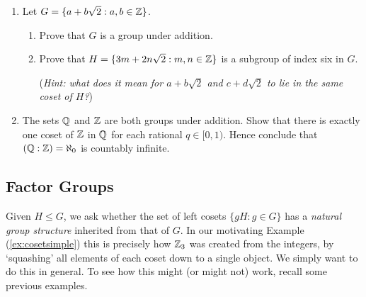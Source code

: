 \begin{exercises}
\begin{enumerate}
			
		\item\label{exs:zsqrt2subgroup} Let $G=\{a+b\sqrt 2:a,b\in\mathbb{Z}\}$.
		\begin{enumerate}
		  \item Prove that $G$ is a group under addition.
		  \item Prove that $H=\{3m+2n\sqrt 2:m,n\in\mathbb{Z}\}$ is a subgroup of index six in $G$.\par
		  (\emph{Hint: what does it mean for $a+b\sqrt 2$ and $c+d\sqrt 2$ to lie in the same coset of $H$?})
		\end{enumerate}
	  
	  \item\label{exs:zqindex} The sets $\mathbb{Q}$ and $\mathbb{Z}$ are both groups under addition. Show that there is exactly one coset of $\mathbb{Z}$ in $\mathbb{Q}$ for each rational $q\in[0,1)$. Hence conclude that $(\mathbb{Q}:\mathbb{Z})=\aleph_0$ is countably infinite.
		
	\end{enumerate}
\end{exercises}


\clearpage


\subsection{Factor Groups}\label{sec:factor}

Given $H\le G$, we ask whether the set of left cosets $\{gH:g\in G\}$ has a \emph{natural group structure} inherited from that of $G$. In our motivating Example (\ref{ex:cosetsimple}) this is precisely how $\mathbb{Z}_3$ was created from the integers, by `squashing' all elements of each coset down to a single object. We simply want to do this in general. To see how this might (or might not) work, recall some previous examples.

